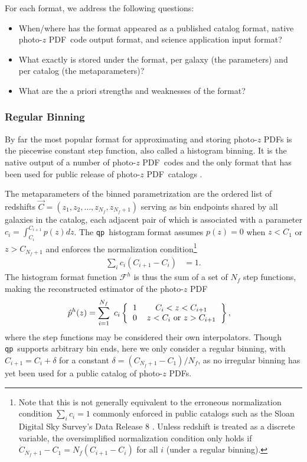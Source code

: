 \documentclass[\docopts]{\docclass}
\newcommand{\qp}{\texttt{qp}}
\newcommand{\pz}{photo-$z$ PDF}
\begin{document}
For each format, we address the following questions:
\begin{itemize}
  \item When/where has the format appeared as a published catalog format, 
native \pz\ code output format, and science application input format?
  \item What exactly is stored under the format, per galaxy (the parameters) 
and per catalog (the metaparameters)?
  \item What are the a priori strengths and weaknesses of the format?
\end{itemize}

\subsubsection{Regular Binning}
\label{sec:bins}

By far the most popular format for approximating and storing \pz s is the 
piecewise constant step function, also called a histogram binning.
It is the native output of a number of \pz\ codes 
\citep{carrasco_kind_somz:_2014, sadeh_annz2:_2016, cavuoti_metaphor:_2017} and 
the only format that has been used for public release of \pz\ catalogs 
\citep{sheldon_photometric_2012, tanaka_photometric_2017, jong_third_2017}.

The metaparameters of the binned parametrization are the ordered list of 
redshifts $\vec{C} = (z_{1}, z_{2}, \dots, z_{N_{f}}, z_{N_{f}+1})$ serving as 
bin endpoints shared by all galaxies in the catalog, each adjacent pair of 
which is associated with a parameter $c_{i} = \int_{C_{i}}^{C_{i+1}} p(z) dz$.
The \qp\ histogram format assumes $p(z)=0$ when $z<C_{1}$ or $z>C_{N_{f}+1}$ 
and enforces the normalization condition\footnote{
Note that this is not generally equivalent to the erroneous normalization 
condition $\sum_{i} c_{i} = 1$ commonly enforced in public catalogs such as the 
Sloan Digital Sky Survey's Data Release 8 \citep{sheldon_photometric_2012}.
Unless redshift is treated as a discrete variable, the oversimplified 
normalization condition only holds if $C_{N_{f}+1} - C_{1} = N_{f} (C_{i+1} - 
C_{i})$ for all $i$ (under a regular binning).
}
\begin{align}
  \label{eq:normed}
  \sum_{i} c_{i} (C_{i+1} - C_{i}) &= 1.
\end{align}
The histogram format function $\mathcal{F}^{h}$ is thus the sum of a set of 
$N_{f}$ step functions, making the reconstructed estimator of the \pz
\begin{align}
  \label{eq:binned}
  \hat{p}^{h}(z) &= \sum_{i=1}^{N_{f}}\ c_{i} 
\left\{\begin{tabular}{cc}$1$&$C_{i}<z<C_{i+1}$\\
0&$z < C_{i}$\ or\ $z > C_{i+1}$\end{tabular}\right\},
\end{align}
where the step functions may be considered their own interpolators.
Though \qp\ supports arbitrary bin ends, here we only consider a regular 
binning, with $C_{i+1} = C_{i} + \delta$ for a constant $\delta = (C_{N_{f}+1} 
- C_{1}) / N_{f}$, as no irregular binning has yet been used for a public 
catalog of \pz s.
\end{document}
